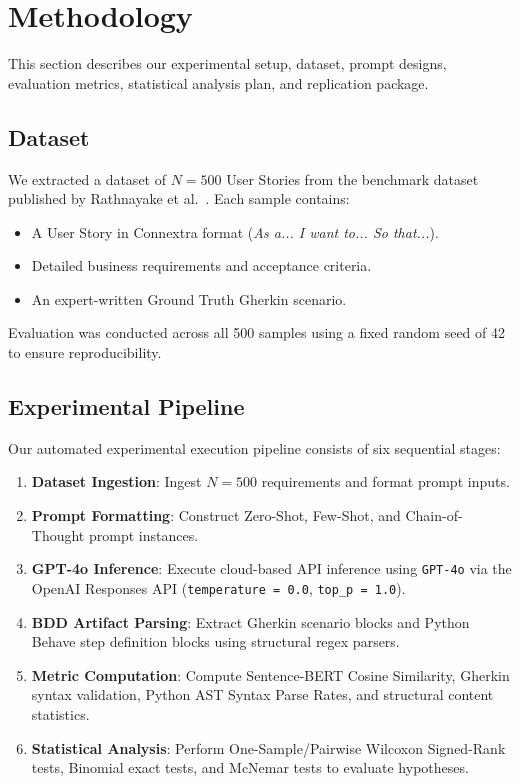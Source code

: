 \section{Methodology}
\label{sec:method}

This section describes our experimental setup, dataset, prompt designs, evaluation metrics, statistical analysis plan, and replication package.

\subsection{Dataset}
We extracted a dataset of $N=500$ User Stories from the benchmark dataset published by Rathnayake et al.~\cite{rathnayake2026}. Each sample contains:
\begin{itemize}
    \item A User Story in Connextra format (\textit{As a... I want to... So that...}).
    \item Detailed business requirements and acceptance criteria.
    \item An expert-written Ground Truth Gherkin scenario.
\end{itemize}
Evaluation was conducted across all 500 samples using a fixed random seed of 42 to ensure reproducibility.

\subsection{Experimental Pipeline}
Our automated experimental execution pipeline consists of six sequential stages:
\begin{enumerate}
    \item \textbf{Dataset Ingestion}: Ingest $N=500$ requirements and format prompt inputs.
    \item \textbf{Prompt Formatting}: Construct Zero-Shot, Few-Shot, and Chain-of-Thought prompt instances.
    \item \textbf{GPT-4o Inference}: Execute cloud-based API inference using \texttt{GPT-4o} via the OpenAI Responses API (\texttt{temperature = 0.0}, \texttt{top\_p = 1.0}).
    \item \textbf{BDD Artifact Parsing}: Extract Gherkin scenario blocks and Python Behave step definition blocks using structural regex parsers.
    \item \textbf{Metric Computation}: Compute Sentence-BERT Cosine Similarity, Gherkin syntax validation, Python AST Syntax Parse Rates, and structural content statistics.
    \item \textbf{Statistical Analysis}: Perform One-Sample/Pairwise Wilcoxon Signed-Rank tests, Binomial exact tests, and McNemar tests to evaluate hypotheses.
\end{enumerate}

